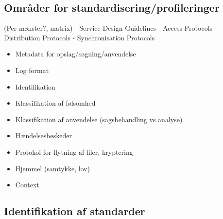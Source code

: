 \subsection{Områder for
standardisering/profileringer}\label{omruxe5der-for-standardiseringprofileringer}

(Per mønster?, matrix) - Service Design Guidelines - Access Protocols -
Distribution Protocols - Synchronisation Protocols

\begin{itemize}
\tightlist
\item
  Metadata for opslag/søgning/anvendelse
\item
  Log format
\item
  Identifikation
\item
  Klassifikation af følsomhed
\item
  Klassifikation af anvendelse (sagsbehandling vs analyse)
\item
  Hændelsesbeskeder
\item
  Protokol for flytning af filer, kryptering
\item
  Hjemmel (samtykke, lov)
\item
  Context
\end{itemize}

\subsection{Identifikation af
standarder}\label{identifikation-af-standarder}
